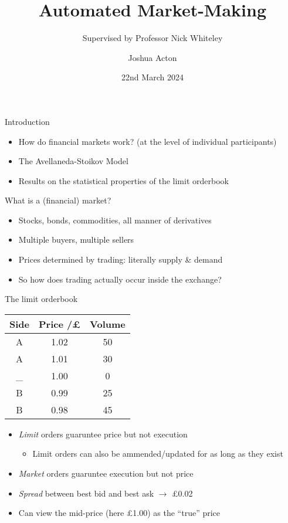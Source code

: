 \documentclass{beamer} %
\title{Automated Market-Making}
\author{Joshua Acton}
\date{22nd March 2024}
\subtitle{Supervised by Professor Nick Whiteley}
\begin{document}
\begin{frame}
    \titlepage
\end{frame}

\begin{frame}{Introduction}
    \begin{itemize}
    \item How do financial markets work? (at the level of individual participants)
    \item The Avellaneda-Stoikov Model
    \item Results on the statistical properties of the limit orderbook
    \end{itemize}
\end{frame}

\begin{frame}{What is a (financial) market?}
    \begin{itemize}
        \item Stocks, bonds, commodities, all manner of derivatives
        \item Multiple buyers, multiple sellers
        \item Prices determined by trading: literally supply \& demand
        \item So how does trading actually occur inside the exchange?
    \end{itemize}
\end{frame}

\begin{frame}{The limit orderbook}
    \begin{center}
        \begin{tabular}{ |c|c|c| } 
            \hline
            Side & Price /£ & Volume \\ 
            \hline
            A & 1.02 & 50 \\
            A & 1.01 & 30 \\
            \_ & 1.00 & 0 \\
            B & 0.99 & 25 \\ 
            B & 0.98 & 45 \\
            \hline
        \end{tabular}
    \end{center}
    \begin{itemize}
        \item \emph{Limit} orders guaruntee price but not execution
        \begin{itemize}
            \item Limit orders can also be ammended/updated for as long as they exist
        \end{itemize}
        \item \emph{Market} orders guaruntee execution but not price
        \item \emph{Spread} between best bid and best ask $\rightarrow$ £0.02
        \item Can view the mid-price (here £1.00) as the ``true'' price
    \end{itemize}
\end{frame}
\end{document}
